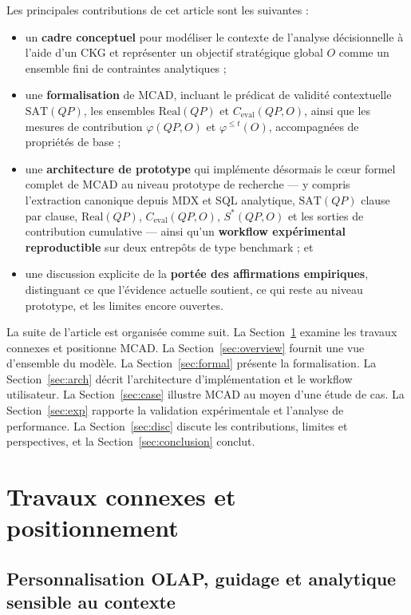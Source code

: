 \documentclass[journal]{IEEEtran}
\begin{document}
Les principales contributions de cet article sont les suivantes :
\begin{itemize}
  \item un \textbf{cadre conceptuel} pour modéliser le contexte de l'analyse décisionnelle à l'aide d'un CKG et représenter un objectif stratégique global $O$ comme un ensemble fini de contraintes analytiques ;
  \item une \textbf{formalisation} de MCAD, incluant le prédicat de validité contextuelle $\mathrm{SAT}(QP)$, les ensembles $\mathrm{Real}(QP)$ et $C_{\mathrm{eval}}(QP,O)$, ainsi que les mesures de contribution $\varphi(QP,O)$ et $\varphi^{\le t}(O)$, accompagnées de propriétés de base ;
  \item une \textbf{architecture de prototype} qui implémente désormais le cœur formel complet de MCAD au niveau prototype de recherche --- y compris l'extraction canonique depuis MDX et SQL analytique, $\mathrm{SAT}(QP)$ clause par clause, $\mathrm{Real}(QP)$, $C_{\mathrm{eval}}(QP,O)$, $S^*(QP,O)$ et les sorties de contribution cumulative --- ainsi qu'un \textbf{workflow expérimental reproductible} sur deux entrepôts de type benchmark ; et
  \item une discussion explicite de la \textbf{portée des affirmations empiriques}, distinguant ce que l'évidence actuelle soutient, ce qui reste au niveau prototype, et les limites encore ouvertes.
\end{itemize}

La suite de l'article est organisée comme suit. La Section~\ref{sec:related} examine les travaux connexes et positionne MCAD. La Section~\ref{sec:overview} fournit une vue d'ensemble du modèle. La Section~\ref{sec:formal} présente la formalisation. La Section~\ref{sec:arch} décrit l'architecture d'implémentation et le workflow utilisateur. La Section~\ref{sec:case} illustre MCAD au moyen d'une étude de cas. La Section~\ref{sec:exp} rapporte la validation expérimentale et l'analyse de performance. La Section~\ref{sec:disc} discute les contributions, limites et perspectives, et la Section~\ref{sec:conclusion} conclut.

\section{Travaux connexes et positionnement}
\label{sec:related}

\subsection{Personnalisation OLAP, guidage et analytique sensible au contexte}
\end{document}
